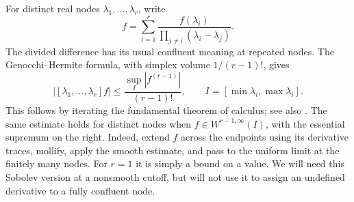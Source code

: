 \documentclass[11pt,a4paper]{article}
\numberwithin{equation}{section}
\theoremstyle{definition}
\theoremstyle{remark}
\begin{document}
For distinct real nodes $\lambda_1,\ldots,\lambda_r$, write
\begin{equation}
 [\lambda_1,\ldots,\lambda_r]f
   =\sum_{i=1}^r\frac{f(\lambda_i)}
           {\prod_{j\ne i}(\lambda_i-\lambda_j)}.
 \label{eq:dd}
\end{equation}
The divided difference has its usual confluent meaning at repeated
nodes. The Genocchi--Hermite formula, with simplex volume $1/(r-1)!$,
gives
\begin{equation}
 |[\lambda_1,\ldots,\lambda_r]f|
  \le\frac{\sup_I|f^{(r-1)}|}{(r-1)!},
 \qquad I=[\min\lambda_i,\max\lambda_i].
 \label{eq:dd-bound}
\end{equation}
This follows by iterating the fundamental theorem of calculus; see also
\cite[formula (52)]{deboor}. The same estimate holds for distinct nodes
when $f\in W^{r-1,\infty}(I)$, with the essential supremum on the right.
Indeed, extend $f$ across the endpoints using its derivative traces,
mollify, apply the smooth estimate, and pass to the uniform limit at
the finitely many nodes. For $r=1$ it is simply a bound on a value.
We will need this Sobolev version at a nonsmooth cutoff, but will not
use it to assign an undefined derivative to a fully confluent node.
\end{document}
